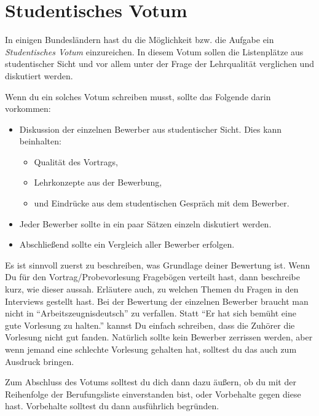 \section{Studentisches Votum}
In einigen Bundesländern hast du die Möglichkeit bzw. die Aufgabe ein \emph{Studentisches Votum} einzureichen. In diesem Votum sollen die Listenplätze aus studentischer Sicht und vor allem unter der Frage der Lehrqualität verglichen und diskutiert werden.

Wenn du ein solches Votum schreiben musst, sollte das Folgende darin vorkommen:
\begin{itemize}
    \item Diskussion der einzelnen Bewerber aus studentischer Sicht. Dies kann beinhalten:
    \begin{itemize}
        \item Qualität des Vortrags,
        \item Lehrkonzepte aus der Bewerbung,
        \item und Eindrücke aus dem studentischen Gespräch mit dem Bewerber.
    \end{itemize}
    \item Jeder Bewerber sollte in ein paar Sätzen einzeln diskutiert werden.
    \item Abschließend sollte ein Vergleich aller Bewerber erfolgen.
\end{itemize}

Es ist sinnvoll zuerst zu beschreiben, was Grundlage deiner Bewertung ist. Wenn Du für den Vortrag/Probevorlesung Fragebögen verteilt hast, dann beschreibe kurz, wie dieser aussah. Erläutere auch, zu welchen Themen du Fragen in den Interviews gestellt hast. Bei der Bewertung der einzelnen Bewerber braucht man nicht in "`Arbeitszeugnisdeutsch"' zu verfallen. Statt "`Er hat sich bemüht eine gute Vorlesung zu halten."' kannst Du einfach schreiben, dass die Zuhörer die Vorlesung nicht gut fanden. Natürlich sollte kein Bewerber zerrissen werden, aber wenn jemand eine schlechte Vorlesung gehalten hat, solltest du das auch zum Ausdruck bringen.

Zum Abschluss des Votums solltest du dich dann dazu äußern, ob du mit der Reihenfolge der Berufungsliste
einverstanden bist, oder Vorbehalte gegen diese hast. Vorbehalte solltest du dann ausführlich begründen.

